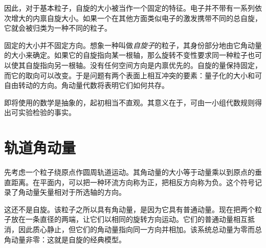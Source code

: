 因此，对于基本粒子，自旋的大小被当作一个固定的特征。电子并不带有一系列依次增大的内禀自旋大小。如果一个在其他方面类似电子的激发携带不同的总自旋，它就会被归类为一种不同的粒子。

固定的大小并不固定方向。想象一种叫做\emph{自旋子}的粒子，其身份部分地由它角动量的大小来确定。如果它的自旋指向某一根轴，那么旋转不变性要求同一种粒子也可以使其自旋指向另一根轴。没有任何空间方向是内禀优先的。自旋的量保持固定，而它的取向可以改变。于是问题有两个表面上相互冲突的要素：量子化的大小和可自由转动的方向。角动量代数将表明它们如何共存。

\begin{classroomqa}
\end{classroomqa}

即将使用的数学是抽象的，起初相当不直观。其意义在于，可由一小组代数规则得出可实验检验的事实。

\section{轨道角动量}

先考虑一个粒子绕原点作圆周轨道运动。其角动量的大小等于动量乘以到原点的垂直距离。在平面内，可以把一种环流方向称为正，把相反方向称为负。这个符号记录了角动量矢量相对于所选轴的方向。

这还不是自旋。该粒子之所以具有角动量，是因为它具有普通动量。现在把两个粒子放在一条直径的两端，让它们以相同的旋转方向运动。它们的普通动量相互抵消，因此质心静止，但它们的角动量指向同一方向并相加。该系统总动量为零而总角动量非零：这就是自旋的经典模型。

